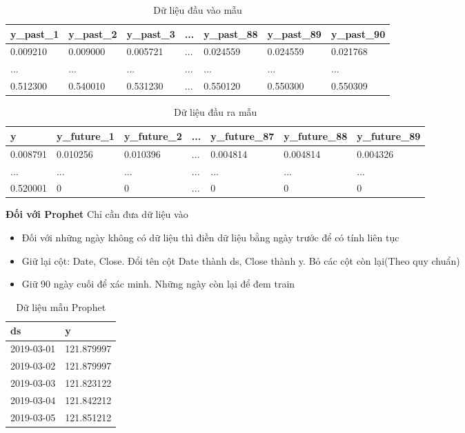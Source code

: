 \begin{table}[h]
	\begin{tabularx}{\textwidth}{X | X | X | X | X | X | X } 
		y\_past\_1	& y\_past\_2	 & y\_past\_3	& ...	& y\_past\_88	 & y\_past\_89	 & y\_past\_90 		\\ \hline
		0.009210	& 0.009000	& 0.005721	& ... & 0.024559	& 0.024559	& 0.021768\\ \hline
		...	& ...	& ...	& ... & ...	& ...	& ... \\ \hline
		0.512300	& 0.540010	& 0.531230	& ... & 0.550120	& 0.550300	& 0.550309\\ %
	\end{tabularx}
	\label{tab:table_input}
	\caption{Dữ liệu đầu vào mẫu}
\end{table}
\begin{table}[h]
	\begin{tabularx}{\textwidth}{X | X | X | X | X | X | X } 
		y	& y\_future\_1 & y\_future\_2	& ...	& y\_future\_87	 & y\_future\_88	 & y\_future\_89		\\ \hline
		0.008791	& 0.010256	& 0.010396		& ... & 0.004814	& 0.004814	& 0.004326\\ \hline
		...	& ...	& ...	& ... & ...	& ...	& ... \\ \hline
		0.520001	& 0	& 0		& ... & 0	& 0	& 0\\ %
\end{tabularx}
	\label{tab:table_output}
	\caption{Dữ liệu đầu ra mẫu}
\end{table}

\clearpage
\textbf{Đối với Prophet}
Chỉ cần đưa dữ liệu vào
\begin{itemize}
    \item Đối với những ngày không có dữ liệu thì điền dữ liệu bằng ngày trước để có tính liên tục \\
    \item Giữ lại cột: Date, Close. Đổi tên cột Date thành ds, Close thành y. Bỏ các cột còn lại(Theo quy chuẩn) \\
    \item Giữ 90 ngày cuối để xác minh. Những ngày còn lại để đem train \\
\end{itemize}
\begin{table}[h]
	\begin{tabularx}{\textwidth}{X | X } 
		ds	& y	  \\ \hline
		2019-03-01	& 121.879997 \\ \hline
		2019-03-02	& 121.879997 \\ \hline
		2019-03-03	& 121.823122 \\ \hline
		2019-03-04	& 121.842212 \\ \hline
		2019-03-05	& 121.851212 \\ %
	\end{tabularx}
	\label{tab:data_prophet}
	\caption{Dữ liệu mẫu Prophet}
\end{table}

